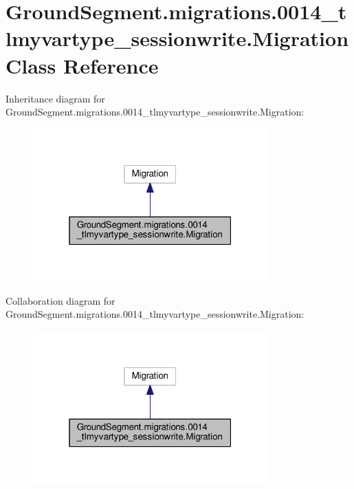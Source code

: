\hypertarget{class_ground_segment_1_1migrations_1_10014__tlmyvartype__sessionwrite_1_1_migration}{}\section{Ground\+Segment.\+migrations.0014\+\_\+tlmyvartype\+\_\+sessionwrite.Migration Class Reference}
\label{class_ground_segment_1_1migrations_1_10014__tlmyvartype__sessionwrite_1_1_migration}


Inheritance diagram for Ground\+Segment.\+migrations.0014\+\_\+tlmyvartype\+\_\+sessionwrite.Migration\+:\nopagebreak
\begin{figure}[H]
\begin{center}
\leavevmode
\includegraphics[width=256pt]{class_ground_segment_1_1migrations_1_10014__tlmyvartype__sessionwrite_1_1_migration__inherit__graph}
\end{center}
\end{figure}


Collaboration diagram for Ground\+Segment.\+migrations.0014\+\_\+tlmyvartype\+\_\+sessionwrite.Migration\+:\nopagebreak
\begin{figure}[H]
\begin{center}
\leavevmode
\includegraphics[width=256pt]{class_ground_segment_1_1migrations_1_10014__tlmyvartype__sessionwrite_1_1_migration__coll__graph}
\end{center}
\end{figure}
